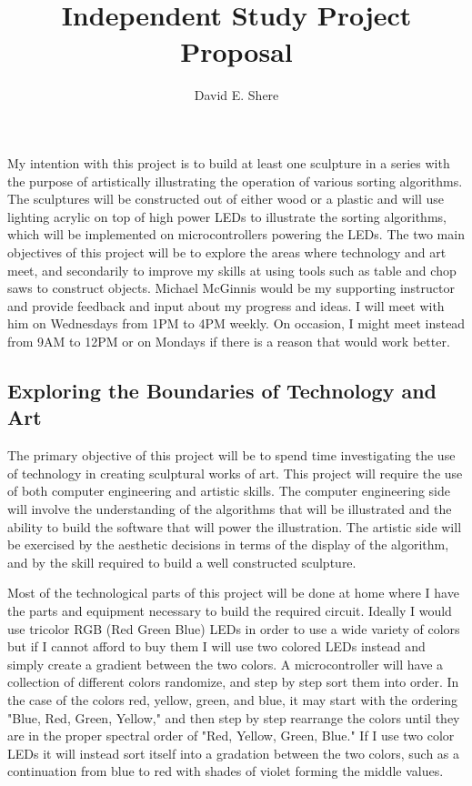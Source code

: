 \documentclass[12pt,a4paper]{article}
\title{\textbf{\doctitle}\\
Independent Study Project Proposal}
\author{David E. Shere}
\begin{document}
\thispagestyle{empty}

\maketitle

My intention with this project is to build at least one sculpture in a series
with the purpose of artistically illustrating the operation of various sorting
algorithms\cite{wiki:sorting_algorithm}.  The sculptures will be constructed out
of either wood or a plastic and will use lighting acrylic on top of high power
LEDs to illustrate the sorting algorithms, which will be implemented on
microcontrollers powering the LEDs.  The two main objectives of this project
will be to explore the areas where technology and art meet, and secondarily to
improve my skills at using tools such as table and chop saws to construct
objects.  Michael McGinnis would be my supporting instructor and provide
feedback and input about my progress and ideas.  I will meet with him on
Wednesdays from 1PM to 4PM weekly.  On occasion, I might meet instead from 9AM to
12PM or on Mondays if there is a reason that would work better.

\subsection*{Exploring the Boundaries of Technology and Art}

The primary objective of this project will be to spend time investigating the
use of technology in creating sculptural works of art.  This project will
require the use of both computer engineering and artistic skills.  The computer
engineering side will involve the understanding of the algorithms that will be
illustrated and the ability to build the software that will power the
illustration.  The artistic side will be exercised by the aesthetic decisions in
terms of the display of the algorithm, and by the skill required to build a well
constructed sculpture.

Most of the technological parts of this project will be done at home where I
have the parts and equipment necessary to build the required circuit.  Ideally I
would use tricolor RGB (Red Green Blue) LEDs in order to use a wide variety of
colors but if I cannot afford to buy them I will use two colored LEDs instead
and simply create a gradient between the two colors.  A
microcontroller will have a collection of different colors
randomize, and step by step sort them into order.  In the case of the colors red,
yellow, green, and blue, it may start with the ordering "Blue, Red, Green,
Yellow," and then step by step rearrange the colors until they are in the proper
spectral order of "Red, Yellow, Green, Blue."  If I use two color LEDs it will
instead sort itself into a gradation between the two colors, such as a
continuation from blue to red with shades of violet forming the middle values.
\end{document}
